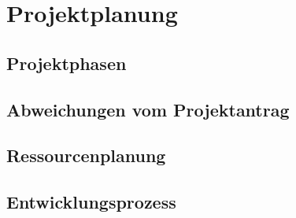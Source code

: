 \section{Projektplanung}
\blindtext
\subsection{Projektphasen}
\subsection{Abweichungen vom Projektantrag}
\subsection{Ressourcenplanung}
\subsection{Entwicklungsprozess}